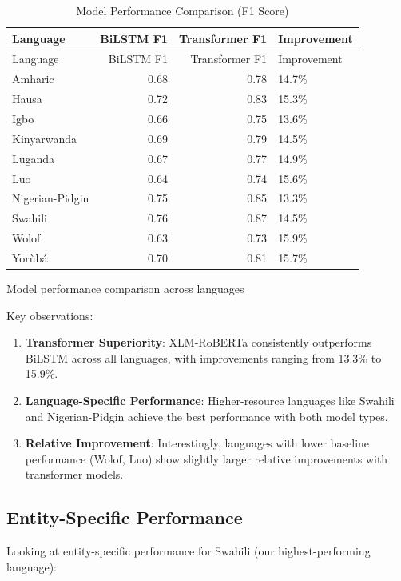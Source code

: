 \documentclass[
]{article}
\begin{document}
\begin{longtable}[]{@{}lrrl@{}}
\caption{Model Performance Comparison (F1 Score)}\tabularnewline
\toprule\noalign{}
Language & BiLSTM F1 & Transformer F1 & Improvement \\
\midrule\noalign{}
\endfirsthead
\toprule\noalign{}
Language & BiLSTM F1 & Transformer F1 & Improvement \\
\midrule\noalign{}
\endhead
\bottomrule\noalign{}
\endlastfoot
Amharic & 0.68 & 0.78 & 14.7\% \\
Hausa & 0.72 & 0.83 & 15.3\% \\
Igbo & 0.66 & 0.75 & 13.6\% \\
Kinyarwanda & 0.69 & 0.79 & 14.5\% \\
Luganda & 0.67 & 0.77 & 14.9\% \\
Luo & 0.64 & 0.74 & 15.6\% \\
Nigerian-Pidgin & 0.75 & 0.85 & 13.3\% \\
Swahili & 0.76 & 0.87 & 14.5\% \\
Wolof & 0.63 & 0.73 & 15.9\% \\
Yorùbá & 0.70 & 0.81 & 15.7\% \\
\end{longtable}

Model performance comparison across languages

Key observations:

\begin{enumerate}
\def\labelenumi{\arabic{enumi}.}
\item
  \textbf{Transformer Superiority}: XLM-RoBERTa consistently outperforms
  BiLSTM across all languages, with improvements ranging from 13.3\% to
  15.9\%.
\item
  \textbf{Language-Specific Performance}: Higher-resource languages like
  Swahili and Nigerian-Pidgin achieve the best performance with both
  model types.
\item
  \textbf{Relative Improvement}: Interestingly, languages with lower
  baseline performance (Wolof, Luo) show slightly larger relative
  improvements with transformer models.
\end{enumerate}

\subsection{Entity-Specific
Performance}\label{entity-specific-performance}

Looking at entity-specific performance for Swahili (our
highest-performing language):
\end{document}
